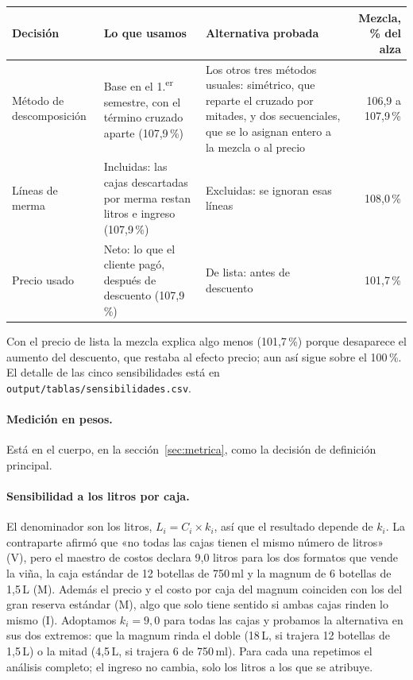 \begin{center}
\small
\begin{tabular}{p{2.6cm} p{4.3cm} p{4.3cm} r}
\hline
\textbf{Decisión} & \textbf{Lo que usamos} & \textbf{Alternativa probada} & \textbf{Mezcla, \% del alza} \\
\hline
Método de descomposición & Base en el 1.\textsuperscript{er} semestre, con el término cruzado aparte (107,9\,\%) & Los otros tres métodos usuales: simétrico, que reparte el cruzado por mitades, y dos secuenciales, que se lo asignan entero a la mezcla o al precio & 106,9 a 107,9\,\% \\[2pt]
Líneas de merma & Incluidas: las cajas descartadas por merma restan litros e ingreso (107,9\,\%) & Excluidas: se ignoran esas líneas & 108,0\,\% \\[2pt]
Precio usado & Neto: lo que el cliente pagó, después de descuento (107,9\,\%) & De lista: antes de descuento & 101,7\,\% \\
\hline
\end{tabular}
\end{center}

\noindent Con el precio de lista la mezcla explica algo menos (101,7\,\%) porque desaparece el aumento del descuento, que restaba al efecto precio; aun así sigue sobre el 100\,\%. El detalle de las cinco sensibilidades está en \texttt{output/tablas/sensibilidades.csv}.

\paragraph{Medición en pesos.} Está en el cuerpo, en la sección~\ref{sec:metrica}, como la decisión de definición principal.

\paragraph{Sensibilidad a los litros por caja.} El denominador son los litros, $L_i = C_i \times k_i$, así que el resultado depende de $k_i$. La contraparte afirmó que «no todas las cajas tienen el mismo número de litros» (V), pero el maestro de costos declara 9,0 litros para los dos formatos que vende la viña, la caja estándar de 12 botellas de 750\,ml y la magnum de 6 botellas de 1,5\,L (M). Además el precio y el costo por caja del magnum coinciden con los del gran reserva estándar (M), algo que solo tiene sentido si ambas cajas rinden lo mismo (I). Adoptamos $k_i = 9{,}0$ para todas las cajas y probamos la alternativa en sus dos extremos: que la magnum rinda el doble (18\,L, si trajera 12 botellas de 1,5\,L) o la mitad (4,5\,L, si trajera 6 de 750\,ml). Para cada una repetimos el análisis completo; el ingreso no cambia, solo los litros a los que se atribuye.

